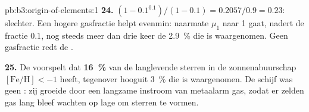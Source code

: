 \begin{solution}{pb:b3:origin-of-elements:1}
\textbf{24.} $(1 - 0.1^{0.1})/(1 - 0.1) = 0.2057/0.9 = \num{0.23}$: slechter.
Een hogere gasfractie helpt evenmin: naarmate $\mu_1$ naar 1 gaat, nadert de
fractie $0.1$, nog steeds meer dan drie keer de
\qty{2.9}{\percent} die is waargenomen. Geen gasfractie redt de .

\textbf{25.} De  voorspelt dat
\textbf{\qty[text-series-to-math=true]{16}{\percent}} van de langlevende
sterren in de zonnenabuurschap $[\mathrm{Fe/H}] < -1$ heeft, tegenover
hooguit \qty{3}{\percent} die is waargenomen. De schijf was geen :
zij groeide door een langzame instroom van metaalarm gas, zodat er zelden
gas lang bleef wachten op lage  om sterren te vormen.
\end{solution}
